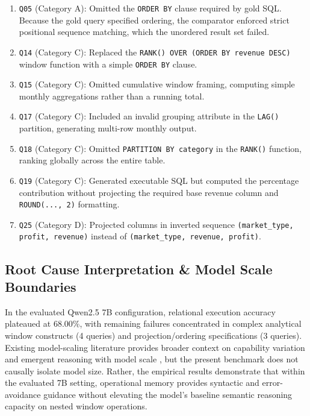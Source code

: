 \documentclass[conference]{IEEEtran}
\begin{document}


\begin{enumerate}
    \item \texttt{Q05} (Category A): Omitted the \texttt{ORDER BY} clause required by gold SQL. Because the gold query specified ordering, the comparator enforced strict positional sequence matching, which the unordered result set failed.
    \item \texttt{Q14} (Category C): Replaced the \texttt{RANK() OVER (ORDER BY revenue DESC)} window function with a simple \texttt{ORDER BY} clause.
    \item \texttt{Q15} (Category C): Omitted cumulative window framing, computing simple monthly aggregations rather than a running total.
    \item \texttt{Q17} (Category C): Included an invalid grouping attribute in the \texttt{LAG()} partition, generating multi-row monthly output.
    \item \texttt{Q18} (Category C): Omitted \texttt{PARTITION BY category} in the \texttt{RANK()} function, ranking globally across the entire table.
    \item \texttt{Q19} (Category C): Generated executable SQL but computed the percentage contribution without projecting the required base revenue column and \texttt{ROUND(..., 2)} formatting.
    \item \texttt{Q25} (Category D): Projected columns in inverted sequence \texttt{(market\_type, profit, revenue)} instead of \texttt{(market\_type, revenue, profit)}.
\end{enumerate}

\subsection{Root Cause Interpretation \& Model Scale Boundaries}
In the evaluated Qwen2.5 7B configuration, relational execution accuracy plateaued at 68.00\%, with remaining failures concentrated in complex analytical window constructs (4 queries) and projection/ordering specifications (3 queries). Existing model-scaling literature provides broader context on capability variation and emergent reasoning with model scale \cite{wei2022emergent}, but the present benchmark does not causally isolate model size. Rather, the empirical results demonstrate that within the evaluated 7B setting, operational memory provides syntactic and error-avoidance guidance without elevating the model's baseline semantic reasoning capacity on nested window operations.
\end{document}
